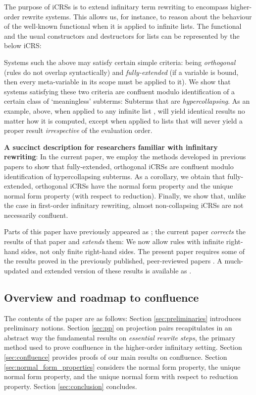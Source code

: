 \documentclass{LMCS}
\theoremstyle{plain}
\theoremstyle{definition}
\begin{document}
The purpose of iCRSs is to extend infinitary term rewriting to encompass higher-order rewrite systems.
This allows us, for instance, to reason about the behaviour of the well-known  functional 
when it is applied to infinite lists. The  functional
and the usual constructors and destructors for lists can be represented by the below iCRS:


Systems such the above may satisfy certain simple criteria: being \emph{orthogonal} (rules do not overlap syntactically) and \emph{fully-extended} (if a variable is bound, then every meta-variable in its scope must be applied to it). We show that systems satisfying these two criteria are confluent modulo identification of a certain class of `meaningless' subterms: Subterms that are \emph{hypercollapsing}. As an example,  above, when applied to any infinite list , will yield identical results no matter how it is computed, except when applied to lists that will never yield a proper result \emph{irrespective} of the evaluation order.

{\bf A succinct description for researchers familiar with infinitary rewriting}: In the current paper, we employ the methods developed in previous papers to show that fully-extended, orthogonal iCRSs are confluent modulo identification of hypercollapsing subterms. As a corollary, we obtain that fully-extended, orthogonal iCRSs have the normal form property and the unique normal form property (with respect to reduction). Finally, we show that, unlike the case in first-order infinitary rewriting, almost non-collapsing iCRSs are not necessarily confluent.  

Parts of this paper have previously appeared as \cite{JJ05b}; the current paper \emph{corrects} the results of that paper and \emph{extends} them: We now allow rules with infinite right-hand sides, not only finite right-hand sides.
The present paper requires some of the results proved in the previously published, peer-reviewed papers \cite{JJ05a,JJ05b}. A much-updated and extended version of these results is available as \cite{paper_i}. 







\subsection{Overview and roadmap to confluence}

The contents of the paper are as follows: Section \ref{sec:preliminaries} introduces preliminary notions. Section \ref{sec:pp} on projection pairs recapitulates in an abstract way the fundamental results on \emph{essential rewrite steps}, the primary method used to prove confluence in the higher-order infinitary setting. Section \ref{sec:confluence} provides
proofs of our main results on confluence.
Section \ref{sec:normal_form_properties} considers
the normal form property, the unique normal form property, and the
unique normal form with respect to reduction property. 
Section \ref{sec:conclusion} concludes.
\end{document}
